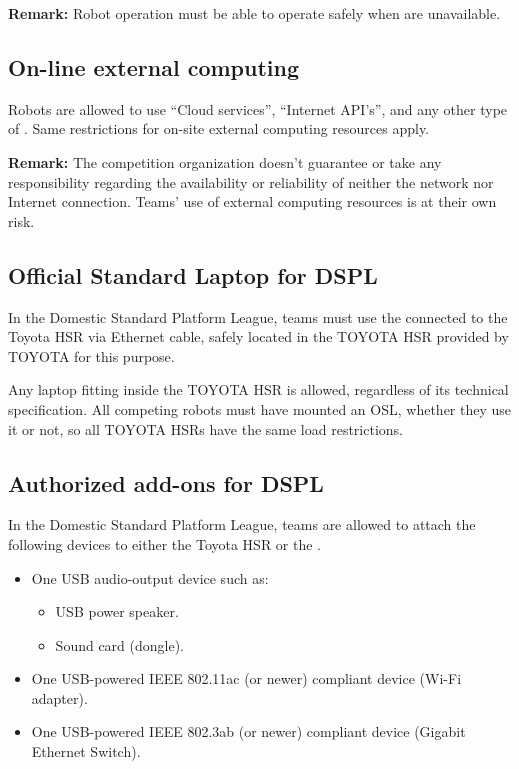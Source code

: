 \noindent \textbf{Remark:} Robot operation must be able to operate safely when  are unavailable.



\subsection{On-line external computing}
\label{rule:robot_external_computing_online}
Robots are allowed to use \enquote{Cloud services}, \enquote{Internet API's}, and any other type of .
Same restrictions for on-site external computing resources apply.

\noindent \textbf{Remark:} The competition organization doesn't guarantee or take any responsibility regarding the availability or reliability of neither the network nor Internet connection.
Teams' use of external computing resources is at their own risk.



\subsection{Official Standard Laptop for DSPL}
\label{rule:osl_dspl}

In the Domestic Standard Platform League, teams must use the  connected to the Toyota HSR via Ethernet cable, safely located in the TOYOTA HSR  provided by TOYOTA for this purpose.

Any laptop fitting inside the TOYOTA HSR  is allowed, regardless of its technical specification.
All competing robots must have mounted an OSL, whether they use it or not, so all TOYOTA HSRs have the same load restrictions.

\subsection{Authorized add-ons for DSPL}
In the Domestic Standard Platform League, teams are allowed to attach the following devices to either the Toyota HSR or the .

\begin{itemize}
	\item One USB audio-output device such as:
	\begin{itemize}
		\item USB power speaker.
		\item Sound card (dongle).
	\end{itemize}
	\item One USB-powered IEEE 802.11ac (or newer) compliant device (Wi-Fi adapter).
	\item One USB-powered IEEE 802.3ab (or newer) compliant device (Gigabit Ethernet Switch).
\end{itemize}

